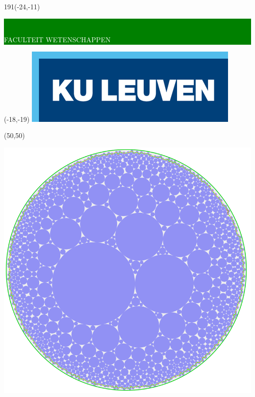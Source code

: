 \documentclass[12pt,a4paper,oneside]{book}
\begin{document}
\thispagestyle{empty}
\newcommand{\form}[1]{\scalebox{1.087}{\boldmath{#1}}}
\sffamily
%
\begin{textblock}{191}(-24,-11)
\colorbox{green}{\hspace{123mm}\ \parbox[c][18truemm]{68mm}{\textcolor{white}{FACULTEIT WETENSCHAPPEN}}}
\end{textblock}
%
\begin{textblock}{70}(-18,-19)
\textblockcolour{}
\includegraphics*[height=19.8truemm]{LogoKULeuven.png}
\end{textblock}
%
\begin{textblock}{79}(50,50)
\centerline{\includegraphics*[height=10.0truecm]{voorbladpacking.png}}
\end{textblock}
\end{document}
